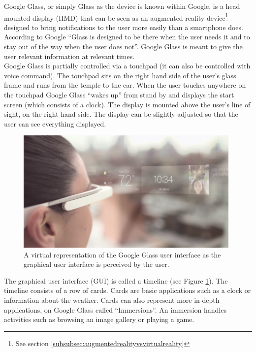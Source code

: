 Google Glass, or simply Glass as the device is known within Google, is a head mounted display (HMD) that can be seen as an augmented reality device\footnote{See section \ref{subsubsec:augmentedrealityvsvirtualreality}} designed to bring notifications to the user more easily than a smartphone does. According to Google ``Glass is designed to be there when the user needs it and to stay out of the way when the user does not''.\cite{glassDesignPrinciples} Google Glass is meant to give the user relevant information at relevant times.\\ 

Google Glass is partially controlled via a touchpad (it can also be controlled with voice command). The touchpad sits on the right hand side of the user's glass frame and runs from the temple to the ear. When the user touches anywhere on the touchpad Google Glass ``wakes up'' from stand by and displays the start screen (which consists of a clock). The display is mounted above the user's line of sight, on the right hand side. The display can be slightly adjusted so that the user can see everything displayed. \\







	\begin{figure}[ht!]
		\centering
		\includegraphics[width=110mm]{images/GoogleGlassUI}
		\caption{A virtual representation of the Google Glass user interface as the graphical user interface is perceived by the user.\cite{ImagesGoogleGlassUI}}
		\label{GoogleGlassUI}
	\end{figure}
	
	
	




The graphical user interface (GUI) is called a timeline (see Figure \ref{GoogleGlassUI}). The timeline consists of a row of cards. Cards are basic applications such as a clock or information about the weather. Cards can also represent more in-depth applications, on Google Glass called ``Immersions''. An immersion handles activities such as browsing an image gallery or playing a game.\\

